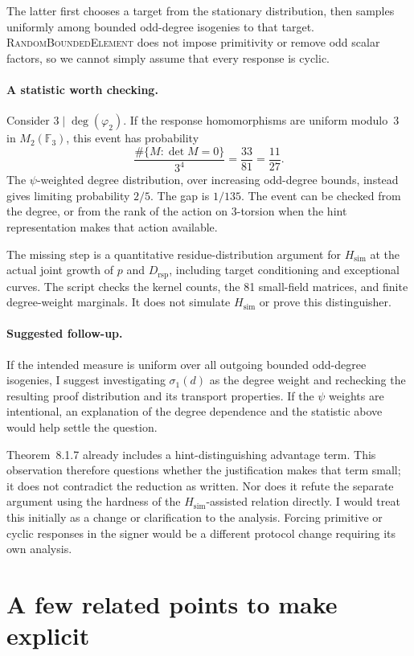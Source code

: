 \documentclass[a4paper,11pt]{article}
\newcommand{\Hsim}{H_{\mathrm{sim}}}
\newcommand{\Drsp}{D_{\mathrm{rsp}}}
\begin{document}
The latter first chooses a target from the stationary distribution, then
samples uniformly among bounded odd-degree isogenies to that target.
\textsc{RandomBoundedElement} does not impose primitivity or remove odd
scalar factors, so we cannot simply assume that every response is cyclic.

\paragraph{A statistic worth checking.}
Consider $3\mid\deg(\varphi_2)$. If the response homomorphisms are uniform
modulo~3 in $M_2(\mathbb{F}_3)$, this event has probability
\[
 \frac{\#\{M:\det M=0\}}{3^4}=\frac{33}{81}=\frac{11}{27}.
\]
The $\psi$-weighted degree distribution, over increasing odd-degree bounds,
instead gives limiting probability $2/5$. The gap is $1/135$. The event
can be checked from the degree, or from the rank of the action on 3-torsion
when the hint representation makes that action available.

The missing step is a quantitative residue-distribution argument for
$\Hsim$ at the actual joint growth of $p$ and $\Drsp$, including target
conditioning and exceptional curves. The script checks the kernel counts,
the 81 small-field matrices, and finite degree-weight marginals. It does
not simulate $\Hsim$ or prove this distinguisher.

\paragraph{Suggested follow-up.}
If the intended measure is uniform over all outgoing bounded odd-degree
isogenies, I suggest investigating $\sigma_1(d)$ as the degree weight and
rechecking the resulting proof distribution and its transport properties.
If the $\psi$ weights are intentional, an explanation of the degree
dependence and the statistic above would help settle the question.

Theorem~8.1.7 already includes a hint-distinguishing advantage term. This
observation therefore questions whether the justification makes that term
small; it does not contradict the reduction as written. Nor does it refute
the separate argument using the hardness of the $\Hsim$-assisted relation
directly. I would treat this initially as a change or clarification to the
analysis. Forcing primitive or cyclic responses in the signer would be a
different protocol change requiring its own analysis.

\section{A few related points to make explicit}
\label{sec:related}
\end{document}
